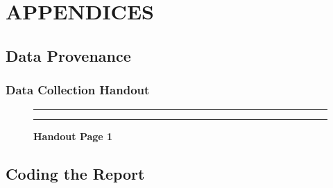 \documentclass[]{article}
\begin{document}
\section{APPENDICES}
\label{sec:appendix}

\subsection{Data Provenance}
\label{sec:appendix-data-provenance}

\subsubsection{Data Collection Handout}
\label{sec:appendix-data-handout}

\begin{figure}[!ht]
    \hrule
    \caption{ \textbf{Handout Page 1} }
    \begin{center}
    \end{center}
    \label{fig:handout-1}
    \hrule
\end{figure}

\subsection{Coding the Report}
\label{sec:appendix-setup}
\end{document}
